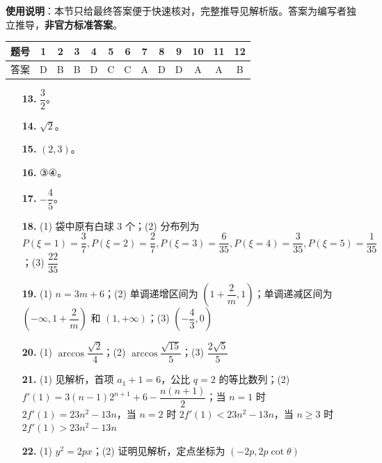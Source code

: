 
\begin{gknotice}
\textbf{使用说明}：本节只给最终答案便于快速核对，完整推导见解析版。答案为编写者独立推导，\textbf{非官方标准答案}。
\end{gknotice}

\begin{center}\begin{tabular}{ccccccccccccc}
\toprule
题号 & 1 & 2 & 3 & 4 & 5 & 6 & 7 & 8 & 9 & 10 & 11 & 12 \\
\midrule
答案 & D & B & B & D & C & C & A & D & D & A & A & B \\
\bottomrule
\end{tabular}\end{center}

\begin{itemize}[leftmargin=2.6em]
  \item[\textbf{13.}] $\dfrac{3}{2}$。
  \item[\textbf{14.}] $\sqrt{2}$。
  \item[\textbf{15.}] $(2, 3)$。
  \item[\textbf{16.}] ③④。
\end{itemize}

\begin{itemize}[leftmargin=2.6em]
  \item[\textbf{17.}] $-\dfrac{4}{5}$。
  \item[\textbf{18.}] (1) 袋中原有白球 $3$ 个；(2) 分布列为 $P(\xi=1)=\dfrac{3}{7}, P(\xi=2)=\dfrac{2}{7}, P(\xi=3)=\dfrac{6}{35}, P(\xi=4)=\dfrac{3}{35}, P(\xi=5)=\dfrac{1}{35}$；(3) $\dfrac{22}{35}$
  \item[\textbf{19.}] (1) $n = 3m + 6$；(2) 单调递增区间为 $\left(1 + \dfrac{2}{m}, 1\right)$；单调递减区间为 $\left(-\infty, 1 + \dfrac{2}{m}\right)$ 和 $(1, +\infty)$；(3) $\left(-\dfrac{4}{3}, 0\right)$
  \item[\textbf{20.}] (1) $\arccos\dfrac{\sqrt{2}}{4}$；(2) $\arccos\dfrac{\sqrt{15}}{5}$；(3) $\dfrac{2\sqrt{5}}{5}$
  \item[\textbf{21.}] (1) 见解析，首项 $a_1 + 1 = 6$，公比 $q = 2$ 的等比数列；(2) $f'(1) = 3(n-1)2^{n+1} + 6 - \dfrac{n(n+1)}{2}$；当 $n = 1$ 时 $2f'(1) = 23n^2 - 13n$，当 $n = 2$ 时 $2f'(1) < 23n^2 - 13n$，当 $n \geqslant 3$ 时 $2f'(1) > 23n^2 - 13n$
  \item[\textbf{22.}] (1) $y^2 = 2px$；(2) 证明见解析，定点坐标为 $(-2p, 2p\cot\theta)$
\end{itemize}
